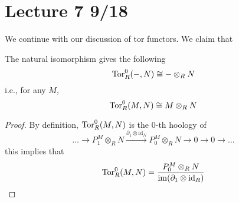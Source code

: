 \section{Lecture 7 9/18}
We continue with our discussion of tor functors. We claim that 
\begin{prop}
    The natural isomorphism gives the following 
    \begin{equation*}
        \text{Tor}_R^0(-,N)\cong-\otimes_RN
    \end{equation*}
    i.e., for any $M$,
    \begin{equation*}
        \text{Tor}_R^0(M,N)\cong M\otimes_RN
    \end{equation*}
\end{prop}
\begin{proof}
    By definition, $\text{Tor}_R^0(M,N)$ is the $0$-th hoology of 
    \begin{equation*}
        \dots\to P_1^M\otimes_RN\xrightarrow{\partial_1\otimes\text{id}_N}P_0^M\otimes_RN\to0\to0\to\dots
    \end{equation*}
    this implies that 
    \begin{equation*}
        \text{Tor}_R^0(M,N)=\frac{P_0^M\otimes_RN}{\operatorname{im}(\partial_1\otimes\text{id}_R)}
    \end{equation*}
\end{proof}
